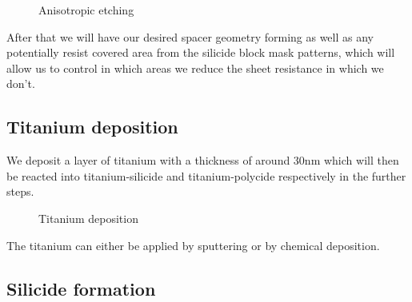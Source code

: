 \begin{figure}[H]
	\centering
	\begin{tikzpicture}[node distance = 3cm, auto, thick,scale=\CrossSectionOnly, every node/.style={transform shape}]
		
	\end{tikzpicture}
	\begin{tikzpicture}[node distance = 3cm, auto, thick,scale=\CrossSectionOnly, every node/.style={transform shape}]
		
	\end{tikzpicture}
	\caption{Anisotropic etching}
\end{figure}

After that we will have our desired spacer geometry forming as well as any potentially resist covered area from the silicide block mask patterns, which will allow us to control in which areas we reduce the sheet resistance in which we don't.

\newpage

\subsection{Titanium deposition}

We deposit a layer of titanium with a thickness of around 30nm which will then be reacted into titanium-silicide and titanium-polycide respectively in the further steps.

\begin{figure}[H]
	\centering
	\begin{tikzpicture}[node distance = 3cm, auto, thick,scale=\CrossSectionOnly, every node/.style={transform shape}]
		
	\end{tikzpicture}
	\begin{tikzpicture}[node distance = 3cm, auto, thick,scale=\CrossSectionOnly, every node/.style={transform shape}]
		
	\end{tikzpicture}
	\caption{Titanium deposition}
\end{figure}

The titanium can either be applied by sputtering or by chemical deposition.

\subsection{Silicide formation}

